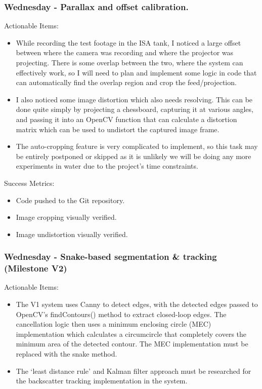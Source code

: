 \subsubsection{Wednesday - Parallax and offset calibration.}

Actionable Items:

\begin{itemize}
    \item While recording the test footage in the ISA tank, I noticed a large offset between where the camera was recording and where the projector was projecting. There is some overlap between the two, where the system can effectively work, so I will need to plan and implement some logic in code that can automatically find the overlap region and crop the feed/projection.
    \item I also noticed some image distortion which also needs resolving. This can be done quite simply by projecting a chessboard, capturing it at various angles, and passing it into an OpenCV function that can calculate a distortion matrix which can be used to undistort the captured image frame.
    \item The auto-cropping feature is very complicated to implement, so this task may be entirely postponed or skipped as it is unlikely we will be doing any more experiments in water due to the project's time constraints.
\end{itemize}

Success Metrics:

\begin{itemize}
    \item Code pushed to the Git repository.
    \item Image cropping visually verified.
    \item Image undistortion visually verified.
\end{itemize}



\subsubsection{Wednesday - Snake-based segmentation \& tracking (Milestone V2)}

Actionable Items:

\begin{itemize}
    \item The V1 system uses Canny to detect edges, with the detected edges passed to OpenCV's findContours() method to extract closed-loop edges. The cancellation logic then uses a minimum enclosing circle (MEC) implementation which calculates a circumcircle that completely covers the minimum area of the detected contour. The MEC implementation must be replaced with the snake method.
    \item The `least distance rule' and Kalman filter approach must be researched for the backscatter tracking implementation in the system.
\end{itemize}

